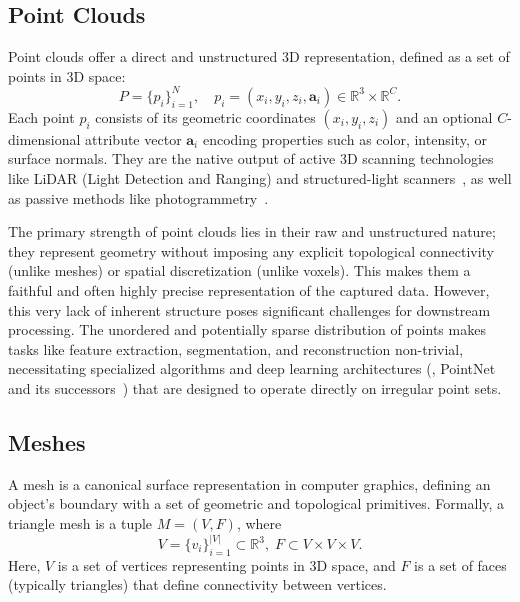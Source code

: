 \subsection{Point Clouds}
\label{sec:rep_3d_point}

Point clouds offer a direct and unstructured 3D representation, defined as a set of points in 3D space:
\begin{equation}
P = \{p_i\}_{i=1}^N, \quad p_i = (x_i, y_i, z_i, \mathbf{a}_i) \in \mathbb{R}^3 \times \mathbb{R}^C.
\end{equation}
Each point $p_i$ consists of its geometric coordinates $(x_i, y_i, z_i)$ and an optional $C$-dimensional attribute vector $\mathbf{a}_i$ encoding properties such as color, intensity, or surface normals. They are the native output of active 3D scanning technologies like LiDAR (Light Detection and Ranging) and structured-light scanners~\cite{behroozpour2017lidar}, as well as passive methods like photogrammetry~\cite{schonberger2016structure}.

The primary strength of point clouds lies in their raw and unstructured nature; they represent geometry without imposing any explicit topological connectivity (unlike meshes) or spatial discretization (unlike voxels).
This makes them a faithful and often highly precise representation of the captured data.
However, this very lack of inherent structure poses significant challenges for downstream processing.
The unordered and potentially sparse distribution of points makes tasks like feature extraction, segmentation, and reconstruction non-trivial, necessitating specialized algorithms and deep learning architectures (\eg, PointNet~\cite{qi2017pointnet} and its successors~\cite{qi2017pointnetplus}) that are designed to operate directly on irregular point sets.


\subsection{Meshes}
\label{sec:rep_3d_mesh}

A mesh is a canonical surface representation in computer graphics, defining an object's boundary with a set of geometric and topological primitives. Formally, a triangle mesh is a tuple $M = (V, F)$, where
\begin{equation}
V = \{v_i\}_{i=1}^{|V|} \subset \mathbb{R}^3, \; F\subset V \times V \times V.
\end{equation}
Here, $V$ is a set of vertices representing points in 3D space, and $F$ is a set of faces (typically triangles) that define connectivity between vertices.

